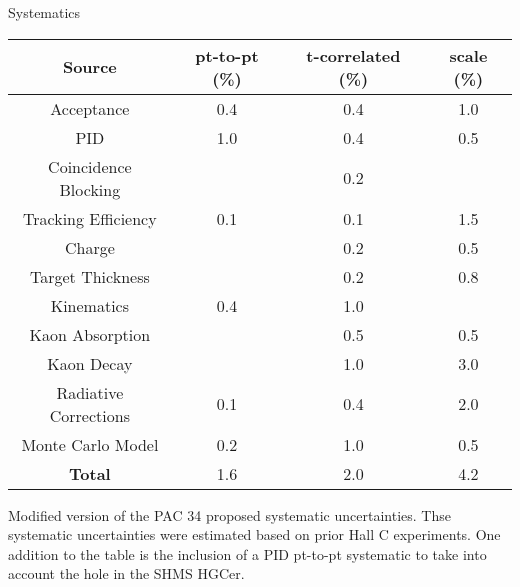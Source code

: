 \begin{Mtable}{Systematics}
  \centering
  \begin{tabular}{|c|c|c|c|}
    \hline
    \textbf{Source} & \textbf{pt-to-pt (\%)} & \textbf{t-correlated (\%)} & \textbf{scale (\%)} \\
    \hline    
    Acceptance            & 0.4  & 0.4  & 1.0 \\
    PID                   & 1.0  & 0.4  & 0.5 \\
    Coincidence Blocking  &      & 0.2  &     \\
    Tracking Efficiency   & 0.1  & 0.1  & 1.5 \\
    Charge                &      & 0.2  & 0.5 \\
    Target Thickness      &      & 0.2  & 0.8 \\
    Kinematics            & 0.4  & 1.0  &     \\
    Kaon Absorption       &      & 0.5  & 0.5 \\
    Kaon Decay            &      & 1.0  & 3.0 \\
    Radiative Corrections & 0.1  & 0.4  & 2.0 \\
    Monte Carlo Model     & 0.2  & 1.0  & 0.5 \\
    \hline    
    \textbf{Total}        & 1.6  & 2.0  & 4.2 \\
    \hline
    \end{tabular}
  \caption{Modified version of the PAC 34 proposed systematic uncertainties. Thse systematic uncertainties were  estimated based on prior Hall C experiments. One addition to the table is the inclusion of a PID pt-to-pt systematic to take into account the hole in the SHMS HGCer.}
  \label{tab:7-1_pac_error}
\end{Mtable}

